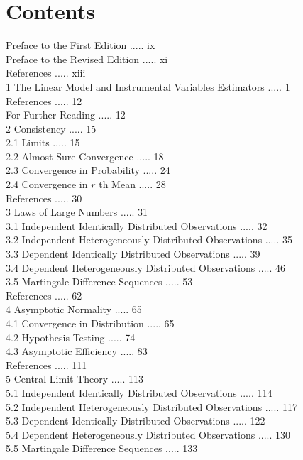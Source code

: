 \documentclass[10pt]{article}
\begin{document}
\section*{Contents}
Preface to the First Edition ..... ix\\
Preface to the Revised Edition ..... xi\\
References ..... xiii\\
1 The Linear Model and Instrumental Variables Estimators ..... 1\\
References ..... 12\\
For Further Reading ..... 12\\
2 Consistency ..... 15\\
2.1 Limits ..... 15\\
2.2 Almost Sure Convergence ..... 18\\
2.3 Convergence in Probability ..... 24\\
2.4 Convergence in $r$ th Mean ..... 28\\
References ..... 30\\
3 Laws of Large Numbers ..... 31\\
3.1 Independent Identically Distributed Observations ..... 32\\
3.2 Independent Heterogeneously Distributed Observations ..... 35\\
3.3 Dependent Identically Distributed Observations ..... 39\\
3.4 Dependent Heterogeneously Distributed Observations ..... 46\\
3.5 Martingale Difference Sequences ..... 53\\
References ..... 62\\
4 Asymptotic Normality ..... 65\\
4.1 Convergence in Distribution ..... 65\\
4.2 Hypothesis Testing ..... 74\\
4.3 Asymptotic Efficiency ..... 83\\
References ..... 111\\
5 Central Limit Theory ..... 113\\
5.1 Independent Identically Distributed Observations ..... 114\\
5.2 Independent Heterogeneously Distributed Observations ..... 117\\
5.3 Dependent Identically Distributed Observations ..... 122\\
5.4 Dependent Heterogeneously Distributed Observations ..... 130\\
5.5 Martingale Difference Sequences ..... 133\\
\end{document}
